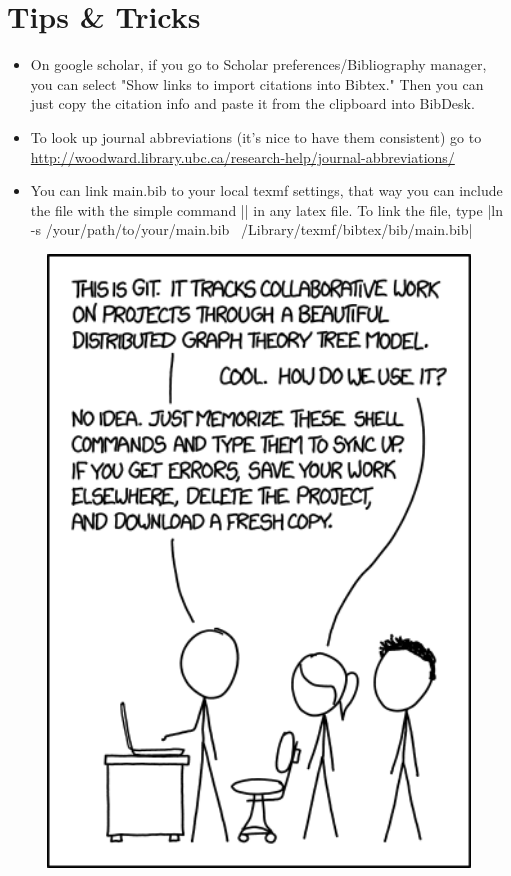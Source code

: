 \documentclass[11pt, oneside]{article}   	%
\begin{document}
\section{Tips \& Tricks}
\begin{itemize}
\item On google scholar, if you go to Scholar preferences/Bibliography manager, you can select "Show links to import citations into Bibtex."  Then you can just copy the citation info and paste it from the clipboard into BibDesk.

\item To look up journal abbreviations (it's nice to have them consistent) go to\\
 \href{http://woodward.library.ubc.ca/research-help/journal-abbreviations/}{http://woodward.library.ubc.ca/research-help/journal-abbreviations/}

\item You can link main.bib to your local texmf settings, that way you can include the file with the simple command
||
in any latex file. To link the file, type
|ln -s /your/path/to/your/main.bib ~/Library/texmf/bibtex/bib/main.bib|
\end{itemize}

\begin{figure}[h]
   \centering
   \includegraphics[width=1.0\textwidth]{git.png} %
   \label{fig:git}
\end{figure}
\end{document}
